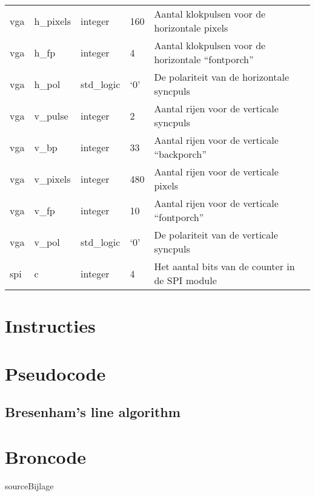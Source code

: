 \documentclass{scrreprt}
\begin{document}
\begin{appendices}
\begin{table}[H]
\begin{tabular}{l l l l l}
		vga & h\_pixels & integer & 160 & Aantal klokpulsen voor de horizontale pixels \\ 
		vga & h\_fp & integer & 4 & Aantal klokpulsen voor de horizontale “fontporch” \\ 
		vga & h\_pol & std\_logic & ‘0’ & De polariteit van de horizontale syncpuls\\ 
		vga & v\_pulse & integer & 2 & Aantal rijen voor de verticale syncpuls\\ 
		vga & v\_bp & integer & 33 & Aantal rijen voor de verticale “backporch” \\ 
		vga & v\_pixels & integer & 480 & Aantal rijen voor de verticale pixels\\ 
		vga & v\_fp & integer & 10 & Aantal rijen voor de verticale “fontporch” \\ 
		vga & v\_pol & std\_logic & ‘0’ & De polariteit van de verticale syncpuls\\ 
		spi & c & integer & 4 & Het aantal bits van de counter in de SPI module\\
	  	\hline
	\end{tabular}
\end{table}

\chapter{Instructies}
\label{app:instructies}


\chapter{Pseudocode}
\label{app:pseudocode}
\section{Bresenham's line algorithm}
\label{appsec:pseudocode-bresenham-line}

\chapter{Broncode}
\label{app:source}
{sourceBijlage}

\end{appendices}
\end{document}
